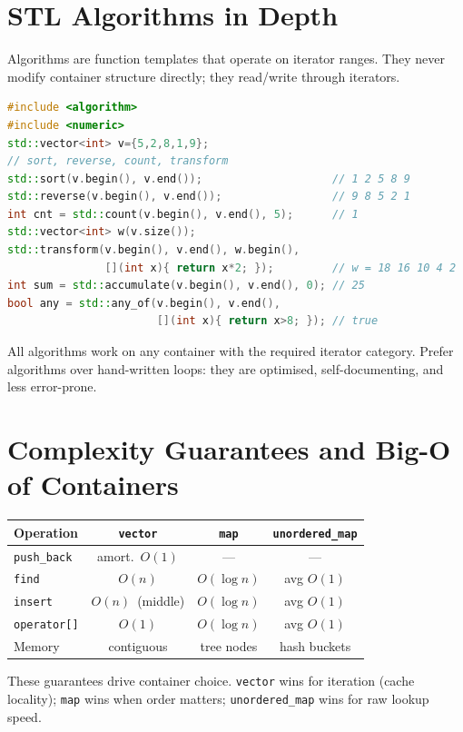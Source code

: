 \section{STL Algorithms in Depth}
Algorithms are function templates that operate on iterator ranges. They never modify container structure directly; they read/write through iterators.

\begin{lstlisting}[language=C++]
#include <algorithm>
#include <numeric>
std::vector<int> v={5,2,8,1,9};
// sort, reverse, count, transform
std::sort(v.begin(), v.end());                    // 1 2 5 8 9
std::reverse(v.begin(), v.end());                 // 9 8 5 2 1
int cnt = std::count(v.begin(), v.end(), 5);      // 1
std::vector<int> w(v.size());
std::transform(v.begin(), v.end(), w.begin(),
               [](int x){ return x*2; });         // w = 18 16 10 4 2
int sum = std::accumulate(v.begin(), v.end(), 0); // 25
bool any = std::any_of(v.begin(), v.end(),
                       [](int x){ return x>8; }); // true
\end{lstlisting}
All algorithms work on any container with the required iterator category. Prefer algorithms over hand-written loops: they are optimised, self-documenting, and less error-prone.

\section{Complexity Guarantees and Big-O of Containers}
\begin{center}\small
\begin{tabular}{lccc}
\toprule Operation & \texttt{vector} & \texttt{map} & \texttt{unordered\_map}\\
\midrule \texttt{push\_back} & amort.\ $O(1)$ & --- & ---\\
\texttt{find} & $O(n)$ & $O(\log n)$ & avg $O(1)$\\
\texttt{insert} & $O(n)$\tiny\ (middle) & $O(\log n)$ & avg $O(1)$\\
\texttt{operator[]} & $O(1)$ & $O(\log n)$ & avg $O(1)$\\
Memory & contiguous & tree nodes & hash buckets\\
\bottomrule
\end{tabular}
\end{center}
These guarantees drive container choice. \texttt{vector} wins for iteration (cache locality); \texttt{map} wins when order matters; \texttt{unordered\_map} wins for raw lookup speed.

